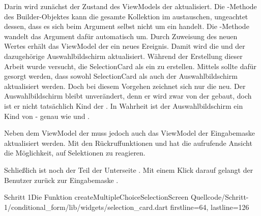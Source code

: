 Darin wird zunächst der Zustand des ViewModels der  aktualisiert.
Die -Methode des Builder-Objektes kann die gesamte Kollektion im  austauschen, ungeachtet dessen, dass es sich beim Argument selbst nicht um ein  handelt.
Die -Methode wandelt das Argument dafür automatisch um.
Durch Zuweisung des neuen Wertes erhält das ViewModel der  ein neues Ereignis.
Damit wird die  und der dazugehörige Auswahlbildschirm aktualisiert.
Während der Erstellung dieser Arbeit wurde versucht, die SelectionCard als ein  zu erstellen.
Mittels  sollte dafür gesorgt werden, dass sowohl SelectionCard als auch der Auswahlbildschirm aktualisiert werden.
Doch bei diesem Vorgehen zeichnet sich nur die  neu.
Der Auswahlbildschirm bleibt unverändert, denn er wird zwar von der  gebaut, doch ist er nicht tatsächlich Kind der .
In Wahrheit ist der Auswahlbildschirm ein Kind von  - genau wie  und .

Neben dem ViewModel der  muss jedoch auch das ViewModel der Eingabemaske aktualisiert werden.
Mit den Rückruffunktionen   und   hat die aufrufende Ansicht die Möglichkeit, auf Selektionen zu reagieren.

Schließlich ist noch der  Teil der Unterseite .
Mit einem Klick darauf gelangt der Benutzer zurück zur Eingabemaske .


\begin{alexlisting}{Schritt 1}{Die Funktion createMultipleChoiceSelectionScreen}
  {Quellcode/Schritt-1/conditional_form/lib/widgets/selection_card.dart}
  {firstline=64, lastline=126}
  \label{lst:Schritt1FunktionCreateMultipleChoiceSelectionScreen}
\end{alexlisting}
 
 
\ifincludeall \clearpage \fi